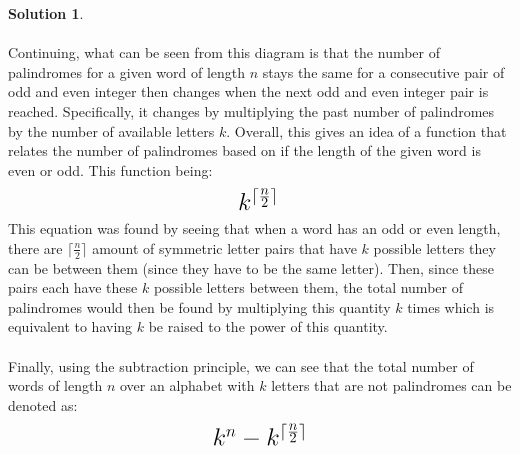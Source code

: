 \documentclass{article}
\theoremstyle{definition}
\newtheorem*{solution}{Solution}
\begin{document}
\begin{solution}
\\\\
Continuing, what can be seen from this diagram is that the number of palindromes for a given word of length $n$ stays the same for a consecutive pair of odd and even integer then changes when the next odd and even integer pair is reached. Specifically, it changes by multiplying the past number of palindromes by the number of available letters $k$. Overall, this gives an idea of a function that relates the number of palindromes based on if the length of the given word is even or odd. This function being:
$$ \mbox{ \LARGE $k^{\lceil \frac{n}{2}\rceil}$ } $$
This equation was found by seeing that when a word has an odd or even length, there are $\lceil \frac{n}{2} \rceil$ amount of symmetric letter pairs that have $k$ possible letters they can be between them (since they have to be the same letter). Then, since these pairs each have these $k$ possible letters between them, the total number of palindromes would then be found by multiplying this quantity $k$ times which is equivalent to having $k$ be raised to the power of this quantity.\\\\
Finally, using the subtraction principle, we can see that the total number of words of length $n$ over an alphabet with $k$ letters that are not palindromes can be denoted as:
$$ \mbox{\LARGE $k^n - k^{\lceil \frac{n}{2} \rceil}$} $$
\end{solution}
\end{document}
